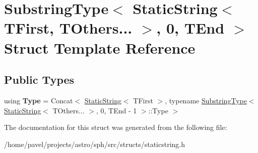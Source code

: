 \hypertarget{structSubstringType_3_01StaticString_3_01TFirst_00_01TOthers_8_8_8_01_4_00_010_00_01TEnd_01_4}{}\section{Substring\+Type$<$ Static\+String$<$ T\+First, T\+Others... $>$, 0, T\+End $>$ Struct Template Reference}
\label{structSubstringType_3_01StaticString_3_01TFirst_00_01TOthers_8_8_8_01_4_00_010_00_01TEnd_01_4}
\subsection*{Public Types}
\begin{DoxyCompactItemize}
\item 
\hypertarget{structSubstringType_3_01StaticString_3_01TFirst_00_01TOthers_8_8_8_01_4_00_010_00_01TEnd_01_4_a6866d4b479425fa03fecfe4c851f9190}{}\label{structSubstringType_3_01StaticString_3_01TFirst_00_01TOthers_8_8_8_01_4_00_010_00_01TEnd_01_4_a6866d4b479425fa03fecfe4c851f9190} 
using {\bfseries Type} = Concat$<$ \hyperlink{structStaticString}{Static\+String}$<$ T\+First $>$, typename \hyperlink{structSubstringType}{Substring\+Type}$<$ \hyperlink{structStaticString}{Static\+String}$<$ T\+Others... $>$, 0, T\+End -\/ 1 $>$\+::Type $>$
\end{DoxyCompactItemize}


The documentation for this struct was generated from the following file\+:\begin{DoxyCompactItemize}
\item 
/home/pavel/projects/astro/sph/src/structs/staticstring.\+h\end{DoxyCompactItemize}
